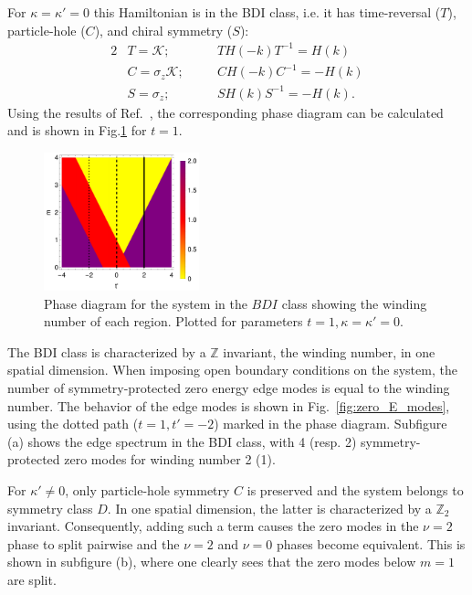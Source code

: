 \documentclass[twocolumn,amsmath,longbibliography,amssymb,superscriptaddress]{revtex4-1}
\begin{document}
For $\kappa = \kappa' = 0$ this Hamiltonian is in the BDI class, i.e. it has time-reversal ($T$), particle-hole ($C$), and chiral symmetry ($S$):
\begin{alignat}{2}
&T = \mathcal{K} ; \quad &&T H(-k) T^{-1} = H(k) \nonumber\\
&C = \sigma_z\mathcal{K} ; \quad &&C H(-k) C^{-1} = -H(k) \nonumber\\
&S = \sigma_z ; \quad &&S H(k)S^{-1} = -H(k) .
\end{alignat}
Using the results of Ref.~\cite{Song2014}, the corresponding phase diagram can be calculated and is shown in Fig.\ref{fig:bdi_phase_diagram} for $t=1$. 
\begin{figure}[t]
	\centering
	\includegraphics[width=45mm]{phase_diagram2.pdf}
	\caption{Phase diagram for the system in the $BDI$ class showing the winding number of each region. Plotted for parameters $t = 1,\kappa =\kappa'=0.$}
\label{fig:bdi_phase_diagram}
\end{figure}
The BDI class  is characterized by a $\mathbb{Z}$ invariant, the winding number,  in one spatial dimension.
When imposing open boundary conditions on the system, the number of symmetry-protected zero energy edge modes is equal to the winding number. 
The behavior of the  edge modes  is  shown in Fig.~\ref{fig:zero_E_modes}, using the dotted path ($t=1,t'=-2$) marked in the phase diagram. 
Subfigure (a) shows the edge spectrum in the BDI class, with 4 (resp. 2) symmetry-protected zero modes for winding number 2 (1). 

For $\kappa' \neq 0$, only particle-hole symmetry $C$ is preserved and the system belongs to symmetry class $D$. 
In one spatial dimension, the latter is characterized by a $\mathbb{Z}_2$ invariant.  
Consequently, adding such a term causes the zero modes in the $\nu=2$ phase to split  pairwise and the $\nu = 2$ and $\nu=0$ phases become equivalent. 
This is shown in subfigure (b), where one clearly sees that the zero modes below $m=1$ are split. 
\end{document}
